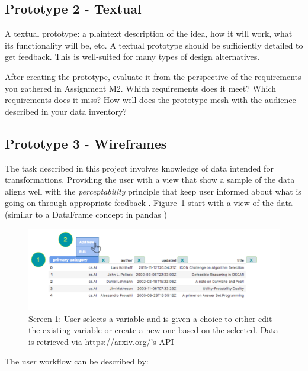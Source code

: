 \documentclass[12pt,letterpaper]{article}
\begin{document}
\subsection*{Prototype 2 - Textual}

A textual prototype: a plaintext description of the idea, how it will work, what its functionality will be, etc. A textual prototype should be sufficiently detailed to get feedback. This is well-suited for many types of design alternatives.

After creating the prototype, evaluate it from the perspective of the requirements you gathered in Assignment M2. Which requirements does it meet? Which requirements does it miss? How well does the prototype mesh with the audience described in your data inventory?

\subsection*{Prototype 3 - Wireframes}
The task described in this project involves knowledge of data intended for transformations. Providing the user with a view that show a sample of the data aligns well with the \textit{perceptability} principle that keep user informed about what is going on through appropriate feedback \cite{nielsen1994usability}. Figure~\ref{fig::2} start with a view of the data (similar to a DataFrame concept in pandas \cite{mckinney2011pandas})

\begin{figure}[h]
\centering
\includegraphics[scale=.3]{figures/m3/wireframe-screen1.png}
\caption{Screen 1: User selects a variable and is given a choice to either edit the existing variable or create a new one based on the selected. Data is retrieved via https://arxiv.org/'s API}
\label{fig::2}
\end{figure}

The user workflow can be described by: 
\end{document}

